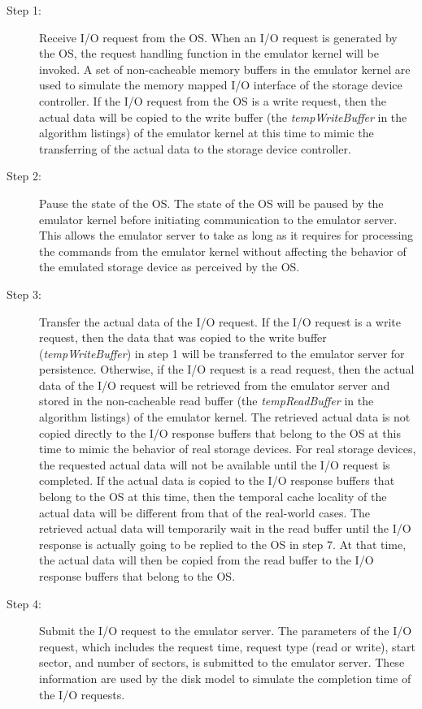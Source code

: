 \begin{description}
	\item[Step 1:] Receive I/O request from the OS. When an I/O request is generated by the OS, the request handling function in the emulator kernel will be invoked. A set of non-cacheable memory buffers in the emulator kernel are used to simulate the memory mapped I/O interface of the storage device controller. If the I/O request from the OS is a write request, then the actual data will be copied to the write buffer (the \textit{tempWriteBuffer} in the algorithm listings) of the emulator kernel at this time to mimic the transferring of the actual data to the storage device controller.
	
	\item[Step 2:] Pause the state of the OS. The state of the OS will be paused by the emulator kernel before initiating communication to the emulator server. This allows the emulator server to take as long as it requires for processing the commands from the emulator kernel without affecting the behavior of the emulated storage device as perceived by the OS.
	
	\item[Step 3:] Transfer the actual data of the I/O request. If the I/O request is a write request, then the data that was copied to the write buffer (\textit{tempWriteBuffer}) in step 1 will be transferred to the emulator server for persistence. Otherwise, if the I/O request is a read request, then the actual data of the I/O request will be retrieved from the emulator server and stored in the non-cacheable read buffer (the \textit{tempReadBuffer} in the algorithm listings) of the emulator kernel. The retrieved actual data is not copied directly to the I/O response buffers that belong to the OS at this time to mimic the behavior of real storage devices. For real storage devices, the requested actual data will not be available until the I/O request is completed. If the actual data is copied to the I/O response buffers that belong to the OS at this time, then the temporal cache locality of the actual data will be different from that of the real-world cases. The retrieved actual data will temporarily wait in the read buffer until the I/O response is actually going to be replied to the OS in step 7. At that time, the actual data will then be copied from the read buffer to the I/O response buffers that belong to the OS.
	
	\item[Step 4:] Submit the I/O request to the emulator server. The parameters of the I/O request, which includes the request time, request type (read or write), start sector, and number of sectors, is submitted to the emulator server. These information are used by the disk model to simulate the completion time of the I/O requests.
	

\end{description}
